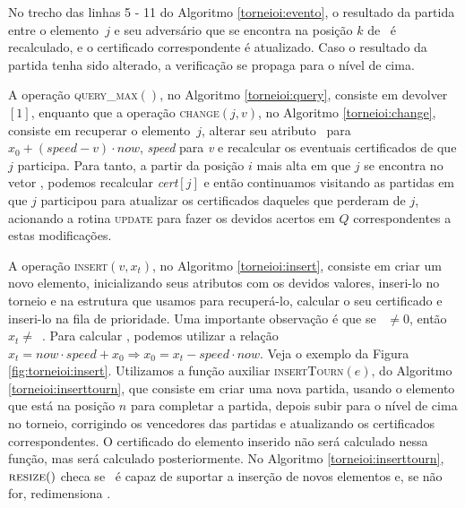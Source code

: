No trecho das linhas 5 - 11 do Algoritmo \ref{torneioi:evento}, o
resultado da partida entre o elemento~$j$ e seu adversário que se
encontra na posição $k$ de \torneio~é recalculado, e o certificado
correspondente é atualizado. Caso o resultado da partida tenha sido
alterado, a verificação se propaga para o nível de cima.





A operação \textsc{query\_max}$()$, no Algoritmo
\ref{torneioi:query}, consiste em devolver \torneio$[1]$, enquanto
que a operação \textsc{change}$(j, v)$, no Algoritmo
\ref{torneioi:change}, consiste em recuperar o elemento~$j$, alterar
seu atributo \initv~para $x_0+(\mathit{speed}-v)\cdot now$,
\textit{speed} para \textit{v} e recalcular os eventuais
certificados de que $j$ participa. Para tanto, a partir da posição
$i$ mais alta em que $j$ se encontra no vetor \torneio, podemos
recalcular \textit{cert}$[j]$ e então continuamos visitando as
partidas em que $j$ participou para atualizar os certificados
daqueles que perderam de $j$, acionando a rotina \textsc{update}
para fazer os devidos acertos em $Q$ correspondentes a estas
modificações.

A operação \textsc{insert}$(v, x_t)$, no Algoritmo
\ref{torneioi:insert}, consiste em criar um novo elemento,
inicializando seus atributos com os devidos valores, inseri-lo no
torneio e na estrutura que usamos para recuperá-lo, calcular o seu
certificado e inseri-lo na fila de prioridade. Uma importante
observação é que se \now~$\neq 0$, então $x_t \neq$~\initv. Para
calcular \initv, podemos utilizar a relação $x_t = now\cdot speed +
x_0 \Rightarrow x_0 = x_t - speed\cdot now$. Veja o exemplo da
Figura \ref{fig:torneioi:insert}. Utilizamos a função auxiliar
\textsc{insertTourn}$(e)$, do Algoritmo \ref{torneioi:inserttourn},
que consiste em criar uma nova partida, usando o elemento que está
na posição $n$ para completar a partida, depois subir para o nível
de cima no torneio, corrigindo os vencedores das partidas e
atualizando os certificados correspondentes. O certificado do
elemento inserido não será calculado nessa função, mas será
calculado posteriormente. No Algoritmo \ref{torneioi:inserttourn},
$\textsc{resize}()$ checa se \torneio~é capaz de suportar a inserção
de novos elementos e, se não for, redimensiona \torneio.



